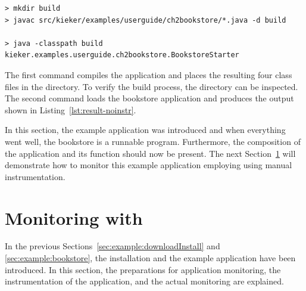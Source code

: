 \setBashListing
% 
\begin{lstlisting}[label=lst:bookstoreStarterNoInstr, caption=Commands to compile and run the Bookstore application]
> mkdir build
> javac src/kieker/examples/userguide/ch2bookstore/*.java -d build

> java -classpath build kieker.examples.userguide.ch2bookstore.BookstoreStarter 
\end{lstlisting}

\noindent The first command compiles the application and places the resulting four class files in the  directory. To verify the build process, the  directory can be inspected. The second command loads the bookstore application and produces the output shown in Listing~\ref{lst:result-noinstr}.



\noindent In this section, the \Kieker{} example application was introduced and when everything went well, the bookstore is a runnable program. Furthermore, the composition of the application and its function should now be present. %
The next Section~\ref{sec:example:monitoring} will demonstrate how %
to monitor this example application employing \KiekerMonitoringPart{} using manual instrumentation.

\pagebreak

\section{Monitoring with \KiekerMonitoringPart{}}\label{sec:example:monitoring}

In the previous Sections~\ref{sec:example:downloadInstall} and \ref{sec:example:bookstore}, the \Kieker{} installation and the example application have been introduced. In this section, the preparations for application monitoring, the instrumentation of the application, and the actual monitoring are explained.

\quad\


